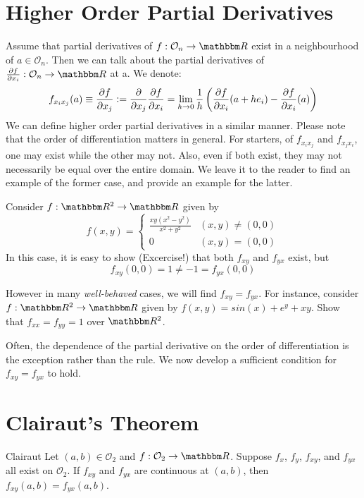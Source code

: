 \documentclass[../Analysis-3]{subfiles}
\begin{document}
\section{Higher Order Partial Derivatives}

Assume that partial derivatives of $f: \mathcal{O}_n \to \R$ exist in a neighbourhood of $a \in \mathcal{O}_n $. Then we can talk about the partial derivatives of $\pdv{f}{x_i}: \mathcal{O}_n \to \R$ at a. We denote:
\[f_{x_i x_j}(a) \equiv \pdv{f}{x_j} \mathrel{\mathop:}= \frac{\partial}{\partial x_j} \pdv{f}{x_i} = \lim_{h \to 0} \frac{1}{h} \left( \pdv{f}{x_i}\/(a+h e_i)- \pdv{f}{x_i}\/ (a) \right)
\]
We can define higher order partial derivatives in a similar manner. Please note that the order of differentiation matters in general. For starters, of  $f_{x_i x_j}$ and $f_{x_j x_i}$, one may exist while the other may not. Also, even if both exist, they may not necessarily be equal over the entire domain. We leave it to the reader to find an example of the former case, and provide an example for the latter.

\begin{Eg}{}{}
    Consider $f: \R^2 \to \R$ given by
    \[
        f(x,y) =
        \begin{cases}
            \frac{xy(x^2 - y^2)}{x^2 + y^2} & (x,y) \neq (0,0) \\
            0                               & (x,y) = (0,0)
        \end{cases}
    \]
    In this case, it is easy to show (Excercise!) that both $f_{xy}$ and $f_{yx}$ exist, but
    \[f_{xy}(0,0) = 1 \neq -1 = f_{yx}(0,0)\]
\end{Eg}

\begin{Eg}{}{}
    However in many \emph{well-behaved} cases, we will find $f_{xy} = f_{yx}$.
    For instance, consider $f: \R^2 \to \R$ given by $f(x,y) = sin(x) + e^y + xy$. Show that $f_{xx} = f_{yy} = 1$ over $\R^2$.
\end{Eg}

Often, the dependence of the partial derivative on the order of differentiation is the exception rather than the rule. We now develop a sufficient condition for $f_{xy} = f_{yx}$ to hold.

\section{Clairaut's Theorem}

\begin{Thm}{Clairaut}{}\label{thm1:19}
    Let $(a,b) \in \mathcal{O}_2$ and $f:\mathcal{O}_2 \to \R$. Suppose $f_x$, $f_y$, $f_{xy}$, and $f_{yx}$ all exist on $\mathcal{O}_2$. If $f_{xy}$ and $f_{yx}$ are continuous at $(a,b)$, then $f_{xy}(a,b) = f_{yx}(a,b)$.
\end{Thm}
\end{document}
